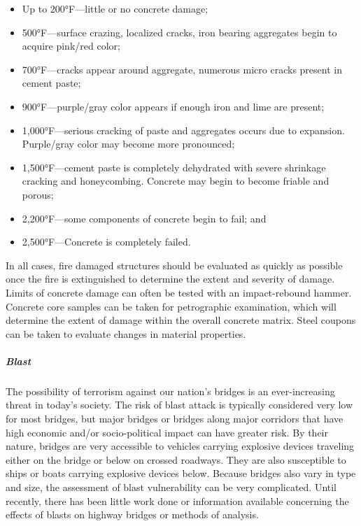 \begin{itemize}
  \item Up to 200°F—little or no concrete damage;
  \item 500°F—surface crazing, localized cracks, iron bearing aggregates begin to acquire pink/red color;
  \item  700°F—cracks appear around aggregate, numerous micro cracks present in cement paste;
  \item  900°F—purple/gray color appears if enough iron and lime are present;
  \item  1,000°F—serious cracking of paste and aggregates occurs due to expansion. Purple/gray color may become
  more pronounced;
  \item  1,500°F—cement paste is completely dehydrated with severe shrinkage cracking and honeycombing.
  Concrete may begin to become friable and porous;
  \item  2,200°F—some components of concrete begin to fail; and
  \item  2,500°F—Concrete is completely failed.
\end{itemize}

In all cases, fire damaged structures should be evaluated as quickly as possible once the fire is extinguished to
determine the extent and severity of damage. Limits of concrete damage can often be tested with an impact-rebound
hammer. Concrete core samples can be taken for petrographic examination, which will determine the extent of
damage within the overall concrete matrix. Steel coupons can be taken to evaluate changes in material properties.

\subparagraph{Blast}

The possibility of terrorism against our nation’s bridges is an ever-increasing threat in today’s society. The risk
of blast attack is typically considered very low for most bridges, but major bridges or bridges along major corridors
that have high economic and/or socio-political impact can have greater risk. By their nature, bridges are very
accessible to vehicles carrying explosive devices traveling either on the bridge or below on crossed roadways. They are also susceptible to ships or boats carrying explosive devices below. Because bridges also vary in type and size,
the assessment of blast vulnerability can be very complicated. Until recently, there has been little work done or
information available concerning the effects of blasts on highway bridges or methods of analysis.

